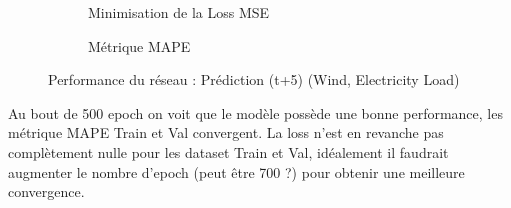 \documentclass{article}
\begin{document}
\begin{figure}[H]
        \centering
        \begin{subfigure}[t]{0.49\textwidth}
            \caption{Minimisation de la Loss MSE}
        \end{subfigure}
        \hfill
        \begin{subfigure}[t]{0.49\textwidth}
        \caption{Métrique MAPE}
    \end{subfigure}
        \caption{Performance du réseau : Prédiction (t+5) (Wind, Electricity Load)}
        \label{fig:test}
    \end{figure}
Au bout de 500 epoch on voit que le modèle possède une bonne performance, les métrique MAPE Train et Val convergent. La loss n'est en revanche pas complètement nulle pour les dataset Train et Val, idéalement il faudrait augmenter le nombre d'epoch (peut être 700 ?) pour obtenir une meilleure convergence.
\end{document}
